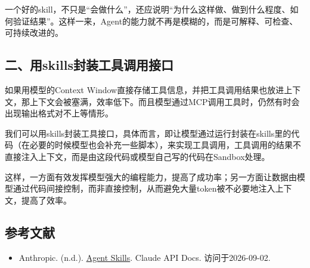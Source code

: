 一个好的skill，不只是``会做什么''，还应说明``为什么这样做、做到什么程度、如何验证结果''。这样一来，Agent的能力就不再是模糊的，而是可解释、可检查、可持续改进的。

\hypertarget{ux4e8cux7528skillsux5c01ux88c5ux5de5ux5177ux8c03ux7528ux63a5ux53e3}{%
\subsection{二、用skills封装工具调用接口}\label{ux4e8cux7528skillsux5c01ux88c5ux5de5ux5177ux8c03ux7528ux63a5ux53e3}}

如果用模型的Context Window直接存储工具信息，并把工具调用结果也放进上下文，那上下文会被塞满，效率低下。而且模型通过MCP调用工具时，仍然有时会出现输出格式对不上等情形。

我们可以用skills封装工具接口，具体而言，即让模型通过运行封装在skills里的代码（在必要的时候模型也会补充一些脚本），来实现工具调用，工具调用的结果不直接注入上下文，而是由这段代码或模型自己写的代码在Sandbox处理。

这样，一方面有效发挥模型强大的编程能力，提高了成功率；另一方面让数据由模型通过代码间接控制，而非直接控制，从而避免大量token被不必要地注入上下文，提高了效率。

\hypertarget{ux53c2ux8003ux6587ux732e-124}{%
\subsection{参考文献}\label{ux53c2ux8003ux6587ux732e-124}}

\vspace{0.25em}
\begin{itemize}
\tightlist
\item
  Anthropic. (n.d.). \href{https://platform.claude.com/docs/en/agents-and-tools/agent-skills/overview}{Agent Skills}. Claude API Docs. 访问于2026-09-02.
\end{itemize}

\clearpage
